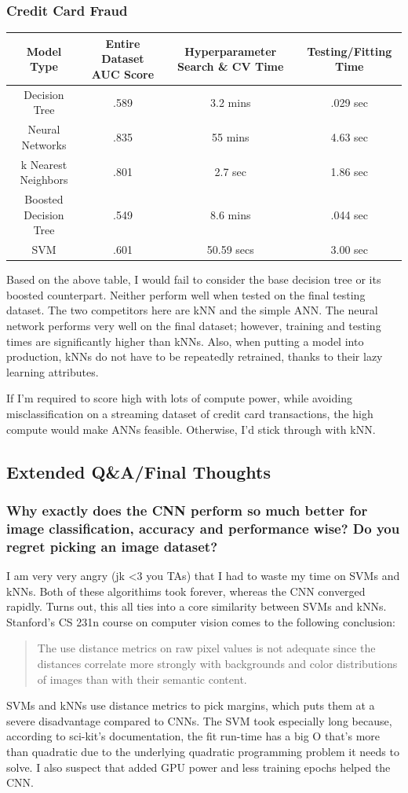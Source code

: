 \documentclass[a4paper]{article}
\begin{document}
\subsubsection{Credit Card Fraud}
\begin{center}
\begin{tabular}{ |c|c|c|c| } 
\hline
Model Type & Entire Dataset AUC Score & Hyperparameter Search \& CV Time & Testing/Fitting Time \\
\hline
Decision Tree & .589 & 3.2 mins & .029 sec\\ 
Neural Networks & .835 & 55 mins & 4.63 sec\\ 
k Nearest Neighbors & .801 & 2.7 sec & 1.86 sec\\ 
Boosted Decision Tree & .549 & 8.6 mins & .044 sec\\ 
SVM & .601 & 50.59 secs & 3.00 sec\\ 
\hline
\end{tabular}
\end{center}
Based on the above table, I would fail to consider the base decision tree or its boosted counterpart. Neither perform well when tested on the final testing dataset. The two competitors here are kNN and the simple ANN. The neural network performs very well on the final dataset; however, training and testing times are significantly higher than kNNs. Also, when putting a model into production, kNNs do not have to be repeatedly retrained, thanks to their lazy learning attributes.

If I'm required to score high with lots of compute power, while avoiding misclassification on a streaming dataset of credit card transactions, the high compute would make ANNs feasible. Otherwise, I'd stick through with kNN. 

\subsection{Extended Q\&A/Final Thoughts}
\subsubsection{Why exactly does the CNN perform so much better for image classification, accuracy and performance wise? Do you regret picking an image dataset?}
I am very very angry (jk <3 you TAs) that I had to waste my time on SVMs and kNNs. Both of these algorithims took forever, whereas the CNN converged rapidly. Turns out, this all ties into a core similarity between SVMs and kNNs. Stanford's CS 231n course on computer vision comes to the following conclusion: 
\begin{quote}
The use distance metrics on raw pixel values is not adequate since the distances correlate more strongly with backgrounds and color distributions of images than with their semantic content.\autocite{Stanford-Img} 
\end{quote}
SVMs and kNNs use distance metrics to pick margins, which puts them at a severe disadvantage compared to CNNs. The SVM took especially long because, according to sci-kit's documentation, the fit run-time has a big O that's more than quadratic due to the underlying quadratic programming problem it needs to solve. I also suspect that added GPU power and less training epochs helped the CNN.
\end{document}
